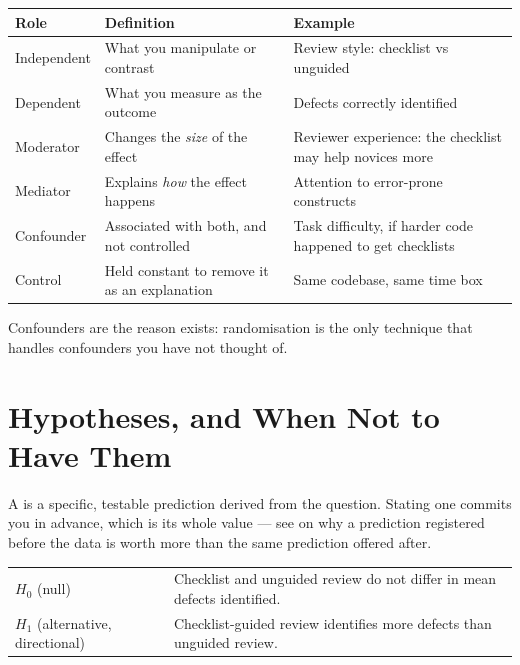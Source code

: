 \begin{center}
\small
\begin{tabular}{@{}L{2.6cm}L{5.0cm}L{6.3cm}@{}}
\toprule
\textbf{Role} & \textbf{Definition} & \textbf{Example} \\
\midrule
Independent  & What you manipulate or contrast & Review style: checklist vs
                                                  unguided \\
Dependent    & What you measure as the outcome & Defects correctly identified \\
Moderator    & Changes the \emph{size} of the effect & Reviewer experience:
                                                       the checklist may help
                                                       novices more \\
Mediator     & Explains \emph{how} the effect happens & Attention to
                                                        error-prone constructs \\
Confounder   & Associated with both, and not controlled & Task difficulty, if
                                                          harder code happened
                                                          to get checklists \\
Control      & Held constant to remove it as an explanation & Same codebase,
                                                              same time box \\
\bottomrule
\end{tabular}
\end{center}

Confounders are the reason  exists: randomisation is the
only technique that handles confounders you have not thought of.

\section{Hypotheses, and When Not to Have Them}

A  is a specific, testable prediction derived from the
question. Stating one commits you in advance, which is its whole value ---
see  on why a prediction registered before the data is worth
more than the same prediction offered after.

\begin{center}
\small
\begin{tabular}{@{}L{3.2cm}L{11.2cm}@{}}
\toprule
$H_0$ (null) & Checklist and unguided review do not differ in mean defects
               identified. \\
$H_1$ (alternative, directional) & Checklist-guided review identifies more
               defects than unguided review. \\
\bottomrule
\end{tabular}
\end{center}

